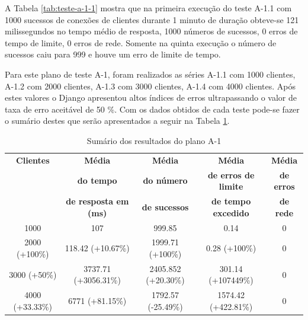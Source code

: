   A Tabela \ref{tab:teste-a-1-1} mostra que na primeira execução do teste A-1.1 com 1000 sucessos de conexões de clientes
  durante 1 minuto de duração obteve-se 121 milissegundos no tempo médio de resposta,
  1000 números de sucessos, 0 erros de tempo de limite, 0 erros de rede. Somente na quinta execução o número de sucessos
  caiu para 999 e houve um erro de limite de tempo.

  Para este plano de teste A-1, foram realizados as séries A-1.1 com 1000 clientes, A-1.2 com 2000 clientes, A-1.3 com 3000 clientes,
  A-1.4 com 4000 clientes. Após estes valores o Django apresentou altos índices de erros ultrapassando o valor de taxa de erro
  aceitável de 50 \%. Com os dados obtidos de cada teste pode-se fazer o sumário
  destes que serão apresentados a seguir na Tabela \ref{tab:sumario-resultado-plano-teste-a-1}.


  \begin{table}[H]
    \centering
    \footnotesize
    \setlength{\abovecaptionskip}{0pt}
    \setlength{\belowcaptionskip}{0pt}
    \caption[Sumário dos resultados do plano A-1]{Sumário dos resultados do plano A-1	}
    \label{tab:sumario-resultado-plano-teste-a-1}
    \begin{tabular}{c|c|c|c|c}
      \hline \hline
      \textbf{Clientes} & \textbf{Média} &	\textbf{Média} & \textbf{Média} & \textbf{Média}  \\
      {}		& \textbf{do tempo} &   \textbf{do número } & \textbf{de erros de limite} & \textbf{de erros}  \\
      {}		& \textbf{de resposta em (ms) } &\textbf{de sucessos } & \textbf{de tempo excedido} & \textbf{de rede} \\
      \hline \hline
      1000 &		107 &					999.85 & 			0.14 &					0 \\
      2000 (+100\%)&	118.42 (+10.67\%) &			1999.71 (+100\%)& 		0.28 (+100\%) &				0 \\
      3000 (+50\%)&	3737.71 (+3056.31\%)&			2405.852 (+20.30\%)& 		301.14 (+107449\%) &			0 \\
      4000 (+33.33\%)&	6771 (+81.15\%) &			1792.57 (-25.49\%)& 		1574.42 (+422.81\%) &			0 \\
      \hline \hline
    \end{tabular}
  \end{table}


